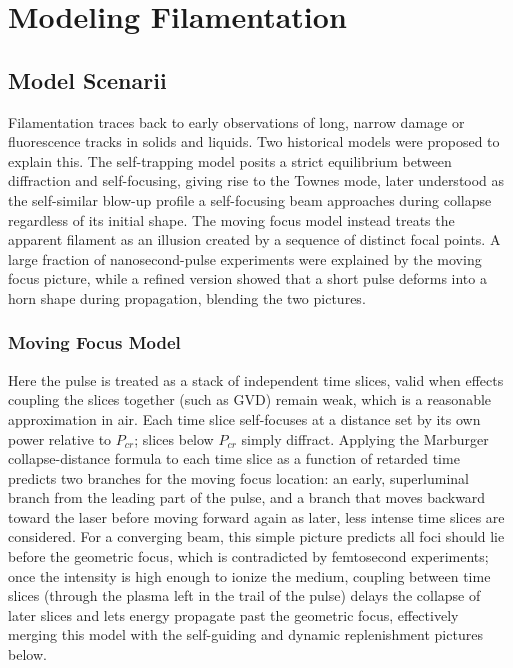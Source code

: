 \documentclass[11pt,a4paper]{article}
\begin{document}
\section{Modeling Filamentation}

\subsection{Model Scenarii}

Filamentation traces back to early observations of long, narrow damage or fluorescence tracks in solids and liquids. Two historical models were proposed to explain this. The self-trapping model posits a strict equilibrium between diffraction and self-focusing, giving rise to the Townes mode, later understood as the self-similar blow-up profile a self-focusing beam approaches during collapse regardless of its initial shape. The moving focus model instead treats the apparent filament as an illusion created by a sequence of distinct focal points. A large fraction of nanosecond-pulse experiments were explained by the moving focus picture, while a refined version showed that a short pulse deforms into a horn shape during propagation, blending the two pictures.

\subsubsection{Moving Focus Model}
Here the pulse is treated as a stack of independent time slices, valid when effects coupling the slices together (such as GVD) remain weak, which is a reasonable approximation in air. Each time slice self-focuses at a distance set by its own power relative to $P_{cr}$; slices below $P_{cr}$ simply diffract. Applying the Marburger collapse-distance formula to each time slice as a function of retarded time predicts two branches for the moving focus location: an early, superluminal branch from the leading part of the pulse, and a branch that moves backward toward the laser before moving forward again as later, less intense time slices are considered. For a converging beam, this simple picture predicts all foci should lie before the geometric focus, which is contradicted by femtosecond experiments; once the intensity is high enough to ionize the medium, coupling between time slices (through the plasma left in the trail of the pulse) delays the collapse of later slices and lets energy propagate past the geometric focus, effectively merging this model with the self-guiding and dynamic replenishment pictures below.
\end{document}
